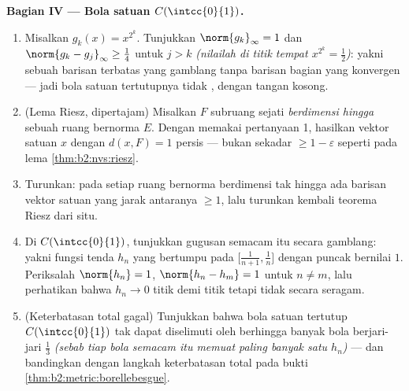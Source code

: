 \begin{problem}
\medskip
\noindent\textbf{Bagian IV --- Bola satuan
$C(\intcc{0}{1})$.}
\begin{enumerate}[resume]
  \item Misalkan $g_k(x) = x^{2^k}$. Tunjukkan $\norm{g_k}_\infty = 1$ dan
        $\norm{g_k - g_j}_\infty \geq \frac14$ untuk $j > k$
        \emph{(nilailah di titik tempat $x^{2^k} =
        \frac12$)}: yakni sebuah barisan terbatas yang gamblang tanpa
        barisan bagian yang konvergen --- jadi bola satuan tertutupnya
        tidak , dengan tangan kosong.
  \item (Lema Riesz, dipertajam) Misalkan $F$ subruang sejati
        \emph{berdimensi hingga} sebuah ruang bernorma
        $E$. Dengan memakai pertanyaan 1, hasilkan vektor satuan $x$
        dengan $d(x, F) = 1$ persis --- bukan sekadar $\geq 1 -
        \varepsilon$ seperti pada lema \cref{thm:b2:nvs:riesz}.
  \item Turunkan: pada setiap ruang bernorma berdimensi tak hingga ada
        barisan vektor satuan yang jarak antaranya
        $\geq 1$, lalu turunkan kembali teorema Riesz dari situ.
  \item Di $C(\intcc{0}{1})$, tunjukkan gugusan semacam itu
        secara gamblang: yakni fungsi tenda $h_n$ yang bertumpu pada
        $\bigl[\frac1{n+1}, \frac1n\bigr]$ dengan puncak bernilai $1$.
        Periksalah $\norm{h_n} = 1$, $\norm{h_n - h_m} = 1$ untuk $n
        \neq m$, lalu perhatikan bahwa $h_n \to 0$ titik demi titik
        tetapi tidak secara seragam.
  \item (Keterbatasan total gagal) Tunjukkan bahwa bola satuan tertutup
        $C(\intcc{0}{1})$ tak dapat diselimuti oleh berhingga banyak
        bola berjari-jari $\frac13$ \emph{(sebab tiap bola semacam itu
        memuat paling banyak satu $h_n$)} --- dan bandingkan dengan
        langkah keterbatasan total pada bukti
        \cref{thm:b2:metric:borellebesgue}.
\end{enumerate}


\end{problem}
